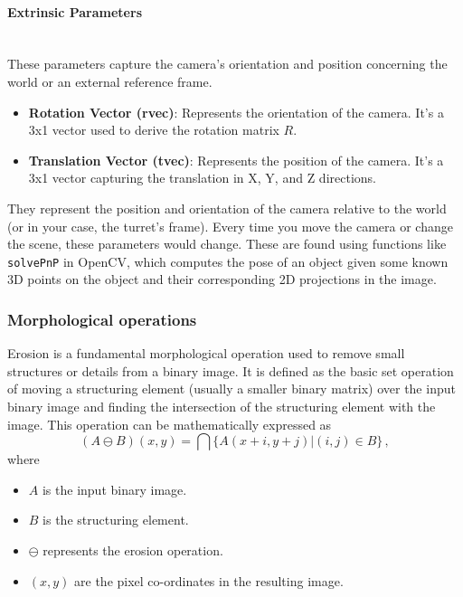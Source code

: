 \paragraph{Extrinsic Parameters}\mbox{}\\
These parameters capture the camera's orientation and position concerning the world or an external reference frame.

\begin{itemize}
    \item \textbf{Rotation Vector (rvec)}: Represents the orientation of the camera. It's a 3x1 vector used to derive the rotation matrix $ R $.

    \item \textbf{Translation Vector (tvec)}: Represents the position of the camera. It's a 3x1 vector capturing the translation in X, Y, and Z directions.
\end{itemize}

They represent the position and orientation of the camera relative to the world (or in your case, the turret's frame). Every time you move the camera or change the scene, these parameters would change. These are found using functions like \verb|solvePnP| in OpenCV, which computes the pose of an object given some known 3D points on the object and their corresponding 2D projections in the image.

\subsubsection{Morphological operations}
\label{subsubsec:morphological_operations}
Erosion is a fundamental morphological operation used to remove small structures or details from a binary image. It is defined as the basic set operation of moving a structuring element (usually a smaller binary matrix) over the input binary image and finding the intersection of the structuring element with the image. This operation can be mathematically expressed as
\begin{equation}
    (A \ominus B)(x, y) = \bigcap \{A(x + i, y + j) | (i, j) \in B\}\,,
    \label{eq:erosion}
\end{equation}
where
\begin{itemize}
    \item $A$ is the input binary image.
    \item $B$ is the structuring element.
    \item $\ominus$ represents the erosion operation.
    \item $(x, y)$ are the pixel co-ordinates in the resulting image.
\end{itemize}

